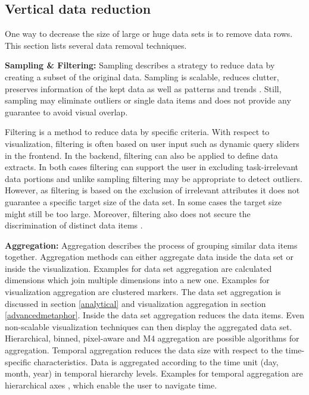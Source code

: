 \subsection{Vertical data reduction}
One way to decrease the size of large or huge data sets is to remove data rows. This section lists several data removal techniques. 

\textbf{Sampling \& Filtering: }\label{sampling}\label{filtering}
Sampling describes a strategy to reduce data by creating a subset of the original data. Sampling is scalable, reduces clutter, preserves information of the kept data as well as patterns and trends \cite{PiringerHarald2011}. Still, sampling may eliminate outliers or single data items and does not provide any guarantee to avoid visual overlap. \par
Filtering is a method to reduce data by specific criteria. With respect to visualization, filtering is often based on user input such as dynamic query sliders in the frontend. In the backend, filtering can also be applied to define data extracts. In both cases filtering can support the user in excluding task-irrelevant data portions and unlike sampling filtering may be appropriate to detect outliers. However, as filtering is based on the exclusion of irrelevant attributes it does not guarantee a specific target size of the data set. In some cases the target size might still be too large. Moreover, filtering also does not secure the discrimination of distinct data items  \cite{PiringerHarald2011}.\par
\textbf{Aggregation: }\label{aggregation}
Aggregation describes the process of grouping similar data items together. Aggregation methods can either aggregate data inside the data set or inside the visualization. Examples for data set aggregation are calculated dimensions which join multiple dimensions into a new one. Examples for visualization aggregation are clustered markers. The data set aggregation is discussed in section \ref{analytical} and visualization aggregation in section \ref{advancedmetaphor}.
Inside the data set aggregation reduces the data items. Even non-scalable visualization techniques can then display the aggregated data set.   Hierarchical, binned, pixel-aware and M4 aggregation are possible algorithms for aggregation.  
Temporal aggregation reduces the data size with respect to the time-specific characteristics. Data is aggregated according to the time unit (day, month, year) in temporal hierarchy levels. Examples for temporal aggregation are hierarchical axes  \cite{Chung2014}, which enable the user to navigate time. 
